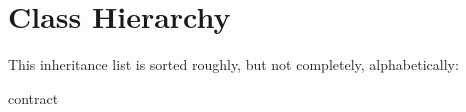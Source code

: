 \section{Class Hierarchy}
This inheritance list is sorted roughly, but not completely, alphabetically\+:\begin{DoxyCompactList}
\item contract\begin{DoxyCompactList}
\item {}
\item {}
\end{DoxyCompactList}
\item {}
\end{DoxyCompactList}
